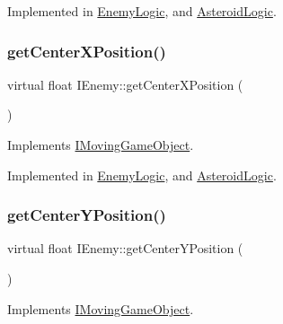 Implemented in \hyperlink{class_enemy_logic_ade03be41505c71de49f20fc855c8fede}{Enemy\+Logic}, and \hyperlink{class_asteroid_logic_a2087d2a3b9bf9e6f1367833454b2fb97}{Asteroid\+Logic}.

\mbox{\label{class_i_enemy_ab5bc39484a8aeaf278c3d127ec5d9545}} 
\subsubsection{\texorpdfstring{get\+Center\+X\+Position()}{getCenterXPosition()}}
{\footnotesize\ttfamily virtual float I\+Enemy\+::get\+Center\+X\+Position (\begin{DoxyParamCaption}{ }\end{DoxyParamCaption})\hspace{0.3cm}{\ttfamily [pure virtual]}}



Implements \hyperlink{class_i_moving_game_object_ae4e6c21094ef1e2db32729270c8a7999}{I\+Moving\+Game\+Object}.



Implemented in \hyperlink{class_enemy_logic_a1429e91a81da7646d9b0280f26519d8c}{Enemy\+Logic}, and \hyperlink{class_asteroid_logic_a4bff0373a2cefe48c984b469ddbcb52d}{Asteroid\+Logic}.

\mbox{\label{class_i_enemy_ac9a2d69103fa86d8344aa368fb33c714}} 
\subsubsection{\texorpdfstring{get\+Center\+Y\+Position()}{getCenterYPosition()}}
{\footnotesize\ttfamily virtual float I\+Enemy\+::get\+Center\+Y\+Position (\begin{DoxyParamCaption}{ }\end{DoxyParamCaption})\hspace{0.3cm}{\ttfamily [pure virtual]}}



Implements \hyperlink{class_i_moving_game_object_a075f69d69fd38dc02a0ec3c7b1cb0534}{I\+Moving\+Game\+Object}.



